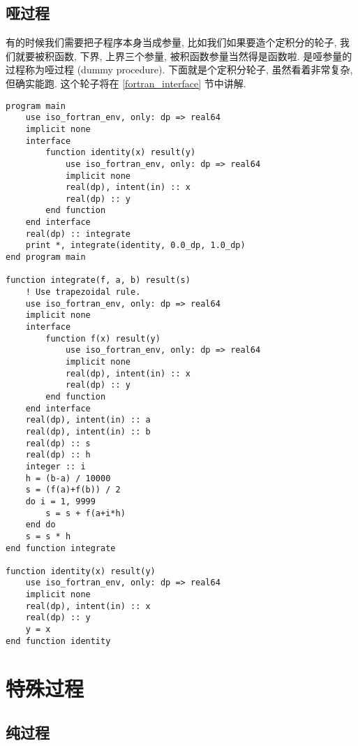 \subsection{哑过程} 

有的时候我们需要把子程序本身当成参量, 比如我们如果要造个定积分的轮子, 我们就要被积函数, 下界, 上界三个参量, 被积函数参量当然得是函数啦. 是哑参量的过程称为哑过程 (dummy procedure). 下面就是个定积分轮子, 虽然看着非常复杂, 但确实能跑. 这个轮子将在 \ref{fortran_interface} 节中讲解. \label{dummy_procedure_program} 
\begin{lstlisting} 
program main
    use iso_fortran_env, only: dp => real64
    implicit none
    interface
        function identity(x) result(y)
            use iso_fortran_env, only: dp => real64
            implicit none
            real(dp), intent(in) :: x
            real(dp) :: y
        end function
    end interface
    real(dp) :: integrate
    print *, integrate(identity, 0.0_dp, 1.0_dp)
end program main

function integrate(f, a, b) result(s)
    ! Use trapezoidal rule.
    use iso_fortran_env, only: dp => real64
    implicit none
    interface
        function f(x) result(y)
            use iso_fortran_env, only: dp => real64
            implicit none
            real(dp), intent(in) :: x
            real(dp) :: y
        end function
    end interface
    real(dp), intent(in) :: a
    real(dp), intent(in) :: b
    real(dp) :: s
    real(dp) :: h
    integer :: i
    h = (b-a) / 10000
    s = (f(a)+f(b)) / 2
    do i = 1, 9999
        s = s + f(a+i*h)
    end do
    s = s * h
end function integrate

function identity(x) result(y)
    use iso_fortran_env, only: dp => real64
    implicit none
    real(dp), intent(in) :: x
    real(dp) :: y
    y = x
end function identity
\end{lstlisting} 

\section{特殊过程}

\subsection{纯过程}\label{pure_procedure}

